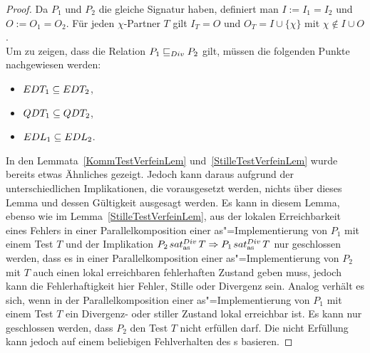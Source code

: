 \begin{proof}
  Da $P_1$ und $P_2$ die gleiche Signatur haben, definiert man $I:=I_1=I_2$ und
  $O:=O_1=O_2$. Für jeden $\chi$-Partner $T$ gilt $I_T=O$ und $O_T =
  I\cup\{\chi\}$ mit $\chi\notin I\cup O$.\\
  Um zu zeigen, dass die Relation $P_1 \sqsubseteq  _{Div} P_2$ gilt, müssen die folgenden
  Punkte nachgewiesen werden:
  \begin{itemize}
    \item $EDT _1\subseteq EDT _2$,
    \item $QDT _1\subseteq QDT _2$,
    \item $EDL _1\subseteq EDL _2$.
  \end{itemize}
  In den Lemmata~\ref{KommTestVerfeinLem} und~\ref{StilleTestVerfeinLem} wurde
  bereits etwas Ähnliches gezeigt. Jedoch kann daraus aufgrund der
  unterschiedlichen Implikationen, die vorausgesetzt werden, nichts über dieses
  Lemma und dessen Gültigkeit ausgesagt werden. Es kann in diesem Lemma, ebenso
  wie im Lemma~\ref{StilleTestVerfeinLem}, aus der lokalen Erreichbarkeit eines
  Fehlers in einer Parallelkomposition einer as"=Implementierung von $P_1$ mit
  einem Test $T$ und der Implikation $P_2 \hspace{0.05cm}sat_\mathrm{as}^{Div}\hspace{0.05cm} T\Rightarrow P_1 \hspace{0.05cm}sat_\mathrm{as}^{Div}\hspace{0.05cm} T$
  nur geschlossen werden, dass es in einer Parallelkomposition einer
  as"=Implementierung von $P_2$ mit $T$ auch einen lokal erreichbaren
  fehlerhaften Zustand geben muss, jedoch kann die Fehlerhaftigkeit hier
  Fehler, Stille oder Divergenz sein. Analog verhält es sich, wenn in der
  Parallelkomposition einer as"=Implementierung von $P_1$ mit einem Test $T$
  ein Divergenz- oder stiller Zustand lokal erreichbar ist. Es kann nur
  geschlossen werden, dass $P_2$ den Test $T$ nicht erfüllen darf. Die nicht
  Erfüllung kann jedoch auf einem beliebigen Fehlverhalten des \MEIO{}s
  basieren.


\end{proof}
